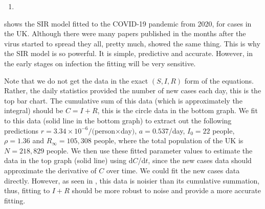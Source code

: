 \begin{example}[frametitle=SIR questions \label{SIR}]
\begin{enumerate}
\begin{enumerate}
\item {}
\end{enumerate}
\end{enumerate}
\end{example}
 shows the SIR model fitted to the COVID-19 pandemic from 2020, for cases in the UK. Although there were many papers published in the months after the virus started to spread they all, pretty much, showed the same thing. This is why the SIR model is so powerful. It is simple, predictive and accurate. However, in the early stages on infection the fitting will be very sensitive.

Note that we do not get the data in the exact $(S,I,R)$ form of the equations. Rather, the daily statistics provided the number of new cases each day, this is the top bar chart. The cumulative sum of this data (which is approximately the integral) should be $C=I+R$, this is the circle data in the bottom graph. We fit to this data (solid line in the bottom graph) to extract out the following predictions  $r=3.34\times 10^{-6}/($person$\times$day$)$,  $a=0.537$/day, $I_0= 22$ people, $\rho=1.36$ and $R_\infty= 105,308$ people, where the total population of the UK is $N=218,829$ people. We then use these fitted parameter values to estimate the data in the top graph (solid line) using d$C$/d$t$, since the new cases data should approximate the derivative of $C$ over time. We could fit the new cases data directly. However, as seen in , this data is noisier than its cumulative summation, thus, fitting to $I+R$ should be more robust to noise and provide a more accurate fitting.


